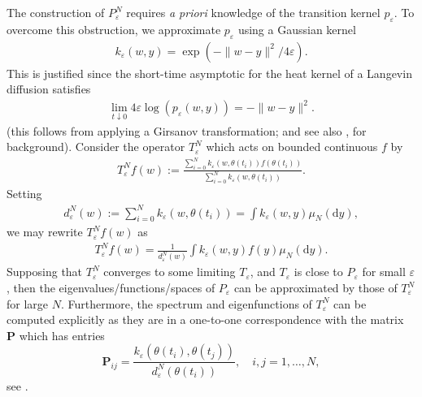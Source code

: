 \documentclass[11pt]{article}
\theoremstyle{plain}
\theoremstyle{definition}
\theoremstyle{remark}
\numberwithin{equation}{section}
\renewcommand{\d}{\mathrm{d}}
\newcommand{\veps}{\varepsilon}
\begin{document}
The construction of $P_\veps^N$ requires \emph{a priori} knowledge of the transition kernel $p_\veps$. To overcome this obstruction, we approximate $p_\veps$ using a Gaussian kernel
\begin{align}\label{eq:kkernel}
k_\veps(w,y)=\exp(-\|w-y\|^2/4\veps). 
\end{align}
This is justified since the short-time asymptotic for the heat kernel of a Langevin diffusion satisfies
\begin{align}
\lim_{t\downarrow 0}4\veps\log(p_\veps(w,y))=-\|w-y\|^2.
\end{align}
(this follows from applying a Girsanov transformation; and see also \citet{hsu2002stochastic}, for background).
Consider the operator $T_\veps^N$ which acts on bounded continuous $f$ by
\begin{align}
T_\veps^Nf(w):=\frac{\sum_{i=0}^N k_\veps(w,\theta(t_i))f(\theta(t_i))}{\sum_{i=0}^N k_\veps(w,\theta(t_i))}.
\end{align}
Setting 
\begin{align}
d_\veps^N(w):=\sum_{i=0}^N k_\veps(w,\theta(t_i))=\int k_\veps(w,y) \mu_N(\d y),
\end{align}
we may rewrite $T_\veps^Nf(w)$ as
\begin{align}
T_\veps^Nf(w)=\frac{1}{d_\veps^N(w)}\int k_\veps(w,y)f(y)\mu_N(\d y).
\end{align}
Supposing that $T_\veps^N$ converges to some limiting $T_\veps$, and $T_\veps$ is close to $P_\veps$ for small $\veps$, then the eigenvalues/functions/spaces of $P_\veps$ can be approximated by those of $T_\veps^N$ for large $N$. Furthermore, the spectrum and eigenfunctions of $T_\veps^N$ can be computed explicitly as they are in a one-to-one correspondence with the matrix $\mathbf{P}$ which has entries
\begin{equation*}
\mathbf{P}_{ij}=\frac{k_\veps(\theta(t_i),\theta(t_j))}{d_\veps^N(\theta(t_i))},\quad i,j=1,\dots,N,
\end{equation*}
see \citet[Proposition 7]{von_luxburg_consistency_2008}.
\end{document}
